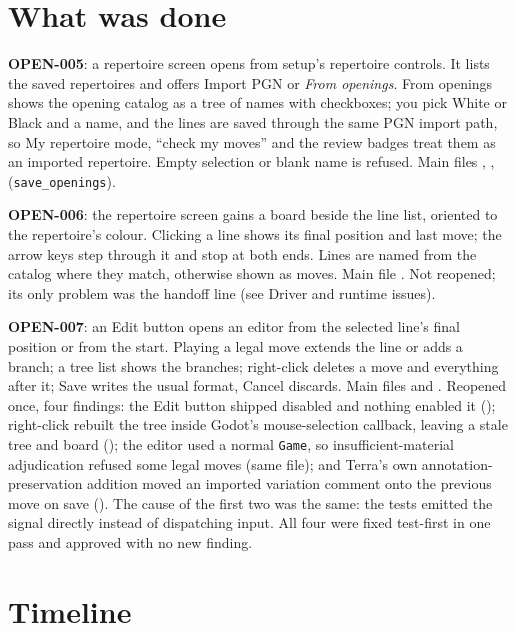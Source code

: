 \documentclass[11pt,a4paper]{article}
\begin{document}
\section*{What was done}

\textbf{OPEN-005}: a repertoire screen opens from setup's repertoire controls. It lists the
saved repertoires and offers Import PGN or \emph{From openings}. From openings shows the opening
catalog as a tree of names with checkboxes; you pick White or Black and a name, and the lines
are saved through the same PGN import path, so My repertoire mode, ``check my moves'' and the
review badges treat them as an imported repertoire. Empty selection or blank name is refused.
Main files , ,
 (\texttt{save\_openings}).

\textbf{OPEN-006}: the repertoire screen gains a board beside the line list, oriented to the
repertoire's colour. Clicking a line shows its final position and last move; the arrow keys step
through it and stop at both ends. Lines are named from the catalog where they match, otherwise
shown as moves. Main file . Not reopened; its only problem was
the handoff line (see Driver and runtime issues).

\textbf{OPEN-007}: an Edit button opens an editor from the selected line's final position or
from the start. Playing a legal move extends the line or adds a branch; a tree list shows the
branches; right-click deletes a move and everything after it; Save writes the usual format,
Cancel discards. Main files  and .
Reopened once, four findings: the Edit button shipped disabled and nothing enabled it
(); right-click rebuilt the tree inside Godot's mouse-selection
callback, leaving a stale tree and board (); the editor used a
normal \texttt{Game}, so insufficient-material adjudication refused some legal moves (same
file); and Terra's own annotation-preservation addition moved an imported variation comment
onto the previous move on save (). The cause of the first two was the
same: the tests emitted the signal directly instead of dispatching input. All four were fixed
test-first in one pass and approved with no new finding.

\section*{Timeline}
\end{document}
